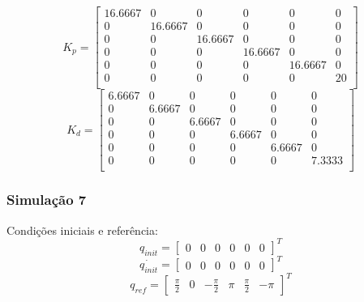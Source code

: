 \documentclass{article}
\begin{document}
\begin{equation}
\label{eq:kp}
K_p=\begin{bmatrix}
16.6667 & 0 & 0 & 0 & 0 & 0\\
0 & 16.6667 & 0 & 0 & 0 & 0\\
0 & 0 & 16.6667 & 0 & 0 & 0\\
0 & 0 & 0 & 16.6667 & 0 & 0\\
0 & 0 & 0 & 0 & 16.6667 & 0\\
0 & 0 & 0 & 0 & 0 & 20\\
\end{bmatrix}
\end{equation}
\begin{equation}
\label{eq:kd}
K_d=\begin{bmatrix}
6.6667 & 0 & 0 & 0 & 0 & 0\\
0 & 6.6667 & 0 & 0 & 0 & 0\\
0 & 0 & 6.6667 & 0 & 0 & 0\\
0 & 0 & 0 & 6.6667 & 0 & 0\\
0 & 0 & 0 & 0 & 6.6667 & 0\\
0 & 0 & 0 & 0 & 0 & 7.3333\\
\end{bmatrix}
\end{equation}

\subsubsection{Simulação 7}
Condições iniciais e referência:
\begin{equation}
\label{eq:sim7q}
q_{init}=\begin{bmatrix}
0 & 0 & 0 & 0 & 0 & 0
\end{bmatrix}^T
\end{equation}
\begin{equation}
\label{eq:sim7qd}
\dot{q_{init}}=\begin{bmatrix}
0 & 0 & 0 & 0 & 0 & 0
\end{bmatrix}^T
\end{equation}
\begin{equation}
\label{eq:sim7qr}
q_{ref}=\begin{bmatrix}
\frac{\pi}{2} & 0 & -\frac{\pi}{2} & \pi & \frac{\pi}{2} & -\pi
\end{bmatrix}^T
\end{equation}
\end{document}
